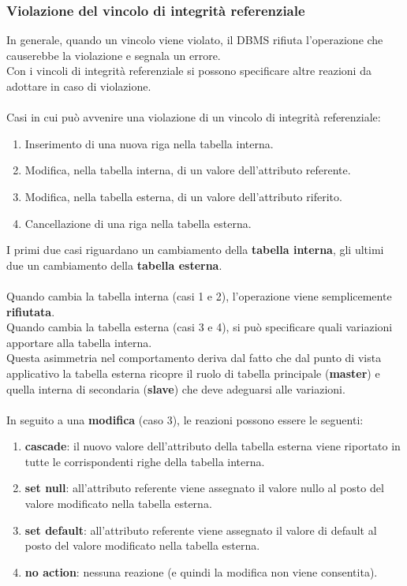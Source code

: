 \subsubsection{Violazione del vincolo di integrità referenziale}
In generale, quando un vincolo viene violato, il DBMS rifiuta l'operazione che causerebbe la violazione e segnala un errore.\\
Con i vincoli di integrità referenziale si possono specificare altre reazioni da adottare in caso di violazione.\\\\
Casi in cui può avvenire una violazione di un vincolo di integrità referenziale:
    \begin{enumerate}
        \item{Inserimento di una nuova riga nella tabella interna.}
        \item{Modifica, nella tabella interna, di un valore dell'attributo referente.}
        \item{Modifica, nella tabella esterna, di un valore dell'attributo riferito.}
        \item{Cancellazione di una riga nella tabella esterna.}
    \end{enumerate}
I primi due casi riguardano un cambiamento della \textbf{tabella interna}, gli ultimi due un cambiamento della \textbf{tabella esterna}.\\\\
Quando cambia la tabella interna (casi 1 e 2), l'operazione viene semplicemente \textbf{rifiutata}.\\
Quando cambia la tabella esterna (casi 3 e 4), si può specificare quali variazioni apportare alla tabella interna.\\
Questa asimmetria nel comportamento deriva dal fatto che dal punto di vista applicativo la tabella esterna ricopre il ruolo di tabella principale (\textbf{master}) e quella interna di secondaria (\textbf{slave}) che deve adeguarsi alle variazioni.\\\\
In seguito a una \textbf{modifica} (caso 3), le reazioni possono essere le seguenti:
    \begin{enumerate}
        \item{\textbf{cascade}: il nuovo valore dell'attributo della tabella esterna viene riportato in tutte le corrispondenti righe della tabella interna.}
        \item{\textbf{set null}: all'attributo referente viene assegnato il valore nullo al posto del valore modificato nella tabella esterna.}
        \item{\textbf{set default}: all'attributo referente viene assegnato il valore di default al posto del valore modificato nella tabella esterna.}
        \item{\textbf{no action}: nessuna reazione (e quindi la modifica non viene consentita).}
    \end{enumerate}
